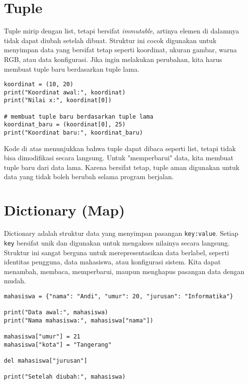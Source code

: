 \section{Tuple}
Tuple mirip dengan list, tetapi bersifat \textit{immutable}, artinya elemen di dalamnya tidak dapat diubah setelah dibuat. 
Struktur ini cocok digunakan untuk menyimpan data yang bersifat tetap seperti koordinat, ukuran gambar, warna RGB, atau data konfigurasi. 
Jika ingin melakukan perubahan, kita harus membuat tuple baru berdasarkan tuple lama.

\begin{lstlisting}[style=PythonStyle]
koordinat = (10, 20)
print("Koordinat awal:", koordinat)
print("Nilai x:", koordinat[0])

# membuat tuple baru berdasarkan tuple lama
koordinat_baru = (koordinat[0], 25)
print("Koordinat baru:", koordinat_baru)
\end{lstlisting}

Kode di atas menunjukkan bahwa tuple dapat dibaca seperti list, 
tetapi tidak bisa dimodifikasi secara langsung. 
Untuk "memperbarui" data, kita membuat tuple baru dari data lama. 
Karena bersifat tetap, tuple aman digunakan untuk data yang tidak boleh berubah selama program berjalan.

\section{Dictionary (Map)}
Dictionary adalah struktur data yang menyimpan pasangan \texttt{key:value}. 
Setiap \texttt{key} bersifat unik dan digunakan untuk mengakses nilainya secara langsung. 
Struktur ini sangat berguna untuk merepresentasikan data berlabel, seperti identitas pengguna, data mahasiswa, atau konfigurasi sistem. 
Kita dapat menambah, membaca, memperbarui, maupun menghapus pasangan data dengan mudah.

\begin{lstlisting}[style=PythonStyle]
mahasiswa = {"nama": "Andi", "umur": 20, "jurusan": "Informatika"}

print("Data awal:", mahasiswa)
print("Nama mahasiswa:", mahasiswa["nama"])

mahasiswa["umur"] = 21
mahasiswa["kota"] = "Tangerang"

del mahasiswa["jurusan"]

print("Setelah diubah:", mahasiswa)
\end{lstlisting}

